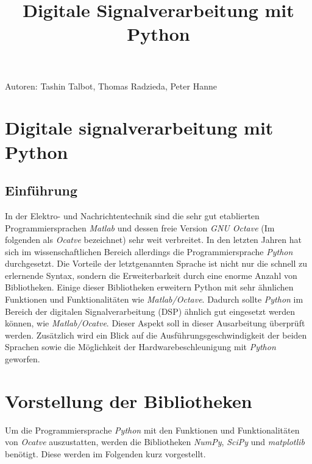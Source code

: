 \documentclass[11pt]{article}
\title{Digitale Signalverarbeitung mit Python}
\begin{document}
    
    \maketitle
    
    

    
    Autoren: Tashin Talbot, Thomas Radzieda, Peter Hanne

\hypertarget{digitale-signalverarbeitung-mit-python}{%
\section{Digitale signalverarbeitung mit
Python}\label{digitale-signalverarbeitung-mit-python}}

\hypertarget{einfuxfchrung}{%
\subsection{Einführung}\label{einfuxfchrung}}

In der Elektro- und Nachrichtentechnik sind die sehr gut etablierten
Programmiersprachen \emph{Matlab} und dessen freie Version \emph{GNU
Octave} (Im folgenden als \emph{Ocatve} bezeichnet) sehr weit
verbreitet. In den letzten Jahren hat sich im wissenschaftlichen Bereich
allerdings die Programmiersprache \emph{Python} durchgesetzt. Die
Vorteile der letztgenannten Sprache ist nicht nur die schnell zu
erlernende Syntax, sondern die Erweiterbarkeit durch eine enorme Anzahl
von Bibliotheken. Einige dieser Bibliotheken erweitern Python mit sehr
ähnlichen Funktionen und Funktionalitäten wie \emph{Matlab/Octave}.
Dadurch sollte \emph{Python} im Bereich der digitalen Signalverarbeitung
(DSP) ähnlich gut eingesetzt werden können, wie \emph{Matlab/Ocatve}.
Dieser Aspekt soll in dieser Ausarbeitung überprüft werden. Zusätzlich
wird ein Blick auf die Ausführungsgeschwindigkeit der beiden Sprachen
sowie die Möglichkeit der Hardwarebeschleunigung mit \emph{Python}
geworfen.

    \hypertarget{vorstellung-der-bibliotheken}{%
\section{Vorstellung der
Bibliotheken}\label{vorstellung-der-bibliotheken}}

Um die Programmiersprache \emph{Python} mit den Funktionen und
Funktionalitäten von \emph{Ocatve} auszustatten, werden die Bibliotheken
\emph{NumPy}, \emph{SciPy} und \emph{matplotlib} benötigt. Diese werden
im Folgenden kurz vorgestellt.
\end{document}
